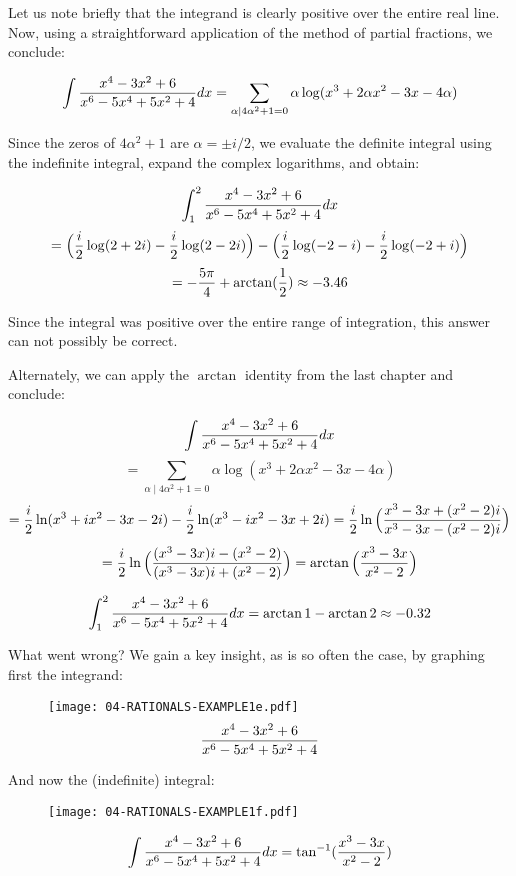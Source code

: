 Let us note briefly that the integrand is clearly positive over the
entire real line.  Now, using a straightforward application of
the method of partial fractions, we conclude:

$$\int {{x^4-3x^2+6}\over{x^6-5x^4+5x^2+4}} dx =
   \sum_{\alpha\mid 4\alpha^2+1=0} \alpha \log(x^3+2\alpha x^2-3x-4\alpha)$$

Since the zeros of $4\alpha^2+1$ are $\alpha=\pm i/2$, we evaluate the
definite integral using the indefinite integral, expand the complex
logarithms, and obtain:

$$\int_1^2 {{x^4-3x^2+6}\over{x^6-5x^4+5x^2+4}} dx $$
$$= \Big({i\over2}\log(2+2i)-{i\over2}\log(2-2i)\Big)
 -\Big({i\over2}\log(-2-i)-{i\over2}\log(-2+i)\Big)$$
$$=-{5\pi\over4}+\arctan({1\over2}) \approx -3.46$$

Since the integral was positive over the entire range of integration,
this answer can not possibly be correct.

Alternately, we can apply the $\arctan$ identity from the last
chapter and conclude:

$$\int {{x^4-3x^2+6}\over{x^6-5x^4+5x^2+4}} dx $$
$$=\sum_{\alpha\mid 4\alpha^2+1=0} \alpha \log(x^3+2\alpha x^2-3x-4\alpha)$$
$$={i\over2}\ln(x^3+ix^2-3x-2i)-{i\over2}\ln(x^3-ix^2-3x+2i)
  ={i\over2}\ln{\Big({{x^3-3x+(x^2-2)i}\over{x^3-3x-(x^2-2)i}}\Big)}$$
$$={i\over2}\ln{\Big({{(x^3-3x)i-(x^2-2)}\over{(x^3-3x)i+(x^2-2)}}\Big)}
  =\arctan{\Big({{x^3-3x}\over{x^2-2}}\Big)}$$

$$\int_1^2 {{x^4-3x^2+6}\over{x^6-5x^4+5x^2+4}} dx = \arctan 1 - \arctan 2 \approx -0.32$$

What went wrong?
We gain a
key insight, as is so often the case, by graphing first the integrand:

\begin{figure}[!h]
\begin{center}
\texttt{[image: 04-RATIONALS-EXAMPLE1e.pdf]}
$${{x^4-3x^2+6}\over{x^6-5x^4+5x^2+4}}$$
\end{center}
\end{figure}

And now the (indefinite) integral:

\begin{figure}[!h]
\begin{center}
\texttt{[image: 04-RATIONALS-EXAMPLE1f.pdf]}
\end{center}
$$\int {{x^4-3x^2+6}\over{x^6-5x^4+5x^2+4}} dx =
\tan^{-1}({{x^3-3x}\over{x^2-2}})$$
\end{figure}

